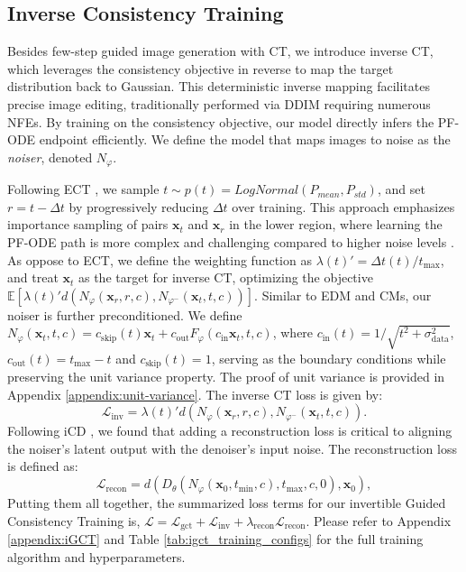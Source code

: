 \subsection{Inverse Consistency Training}
\vspace{-0.15cm}

\label{sec:method-ict}
Besides few-step guided image generation with CT, we introduce inverse CT, which leverages the consistency objective in reverse to map the target distribution back to Gaussian. This deterministic inverse mapping facilitates precise image editing, traditionally performed via DDIM requiring numerous NFEs. By training on the consistency objective, our model directly infers the PF-ODE endpoint efficiently. We define the model that maps images to noise as the \textit{noiser}, denoted \(N_\varphi\).

Following ECT \cite{ect}, we sample \(t \sim p(t) = \textit{LogNormal}(P_\textit{mean}, P_\textit{std})\), and set \(r = t - \Delta t\) by progressively reducing \(\Delta t\) over training. This approach emphasizes importance sampling of pairs \(\boldsymbol{x}_t\) and \(\boldsymbol{x}_r\) in the lower region, where learning the PF-ODE path is more complex and challenging compared to higher noise levels \cite{karras2022elucidating, song2023improved}. As oppose to ECT, we define the weighting function as \(\lambda(t)' = \Delta t(t) / t_\text{max}\), and treat \(\boldsymbol{x}_t\) as the target for inverse CT, optimizing the objective \(\mathbb{E}[\lambda(t)'d(N_\varphi(\boldsymbol{x}_r,r,c),N_{{\varphi}^{-}}( \boldsymbol{x}_t,t,c))]\). Similar to EDM and CMs, our noiser is further preconditioned. We define \(N_{\varphi}(\boldsymbol{x}_t,t,c) = c_\text{skip}(t)\boldsymbol{x}_t + c_\text{out} F_{\varphi}(c_\text{in}\boldsymbol{x}_t, t, c) \), where \(c_\text{in}(t) = 1/\sqrt{t^2+\sigma_\text{data}^2}\), \(c_\text{out}(t) = t_\text{max} - t\) and \(c_\text{skip}(t) = 1\), serving as the boundary conditions while preserving the unit variance property. The proof of unit variance is provided in Appendix \ref{appendix:unit-variance}. The inverse CT loss is given by:
\begin{equation}
     \mathcal{L}_\text{inv} = \lambda(t)'d(N_{\varphi}(\boldsymbol{x}_r,r,c),N_{{\varphi}^-}(\boldsymbol{x}_t,t,c)). 
    \label{eq:inv-loss}
\end{equation}
Following iCD \cite{starodubcev2024invertible}, we found that adding a reconstruction loss is critical to aligning the noiser's latent output with the denoiser's input noise. The reconstruction loss is defined as:
\begin{equation}
     \mathcal{L}_\text{recon} = d(D_{\theta}(N_{\varphi}(\boldsymbol{x}_0,t_\text{min},c),t_\text{max},c,0), \boldsymbol{x}_0),
    \label{eq:recon-loss}
\end{equation}
Putting them all together, the summarized loss terms for our invertible Guided Consistency Training is, \(\mathcal{L} = \mathcal{L}_\text{gct} + \mathcal{L}_\text{inv} + \lambda_{\text{recon}}\mathcal{L}_\text{recon} \). Please refer to Appendix \ref{appendix:iGCT} and Table \ref{tab:igct_training_configs} for the full training algorithm and hyperparameters.

